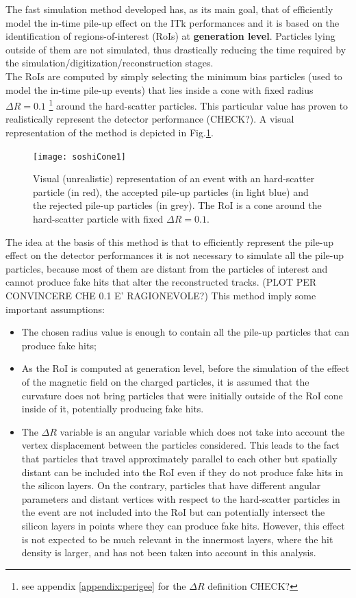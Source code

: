 \documentclass[a4paper,twoside,12pt]{article}
\begin{document}
The fast simulation method developed has, as its main goal, that of efficiently model the
in-time pile-up effect on the ITk performances and it is based on the identification of 
regions-of-interest (RoIs) at \textbf{generation level}. Particles lying outside of them are not 
simulated, thus drastically reducing the time required by the simulation/digitization/reconstruction stages. \\

The RoIs are computed by simply selecting the minimum bias particles (used to model the in-time
pile-up events) that lies inside a cone with fixed radius $\Delta R = 0.1$ \footnote{see appendix \ref{appendix:perigee} for the $\Delta R$ definition CHECK?}
around the hard-scatter particles. This particular value has proven to realistically represent the detector performance (CHECK?). A visual
representation of the method is depicted in Fig.\ref{fig:soshiCone1}.\\

\begin{figure} [h]
	\centering
	\texttt{[image: soshiCone1]}
	\caption{Visual (unrealistic) representation of an event with an hard-scatter particle (in red), 
	the accepted pile-up particles (in light blue) and the rejected pile-up particles (in grey).
	The RoI is a cone around the hard-scatter particle with fixed $\Delta R = 0.1$.}
	\label{fig:soshiCone1}
\end{figure}


The idea at the basis of this method is that to efficiently represent the pile-up effect on the
detector performances it is not necessary to simulate all the pile-up particles, because most 
of them are distant from the particles of interest and cannot produce fake hits that 
alter the reconstructed tracks. (PLOT PER CONVINCERE CHE 0.1 E' RAGIONEVOLE?) This 
method imply some important assumptions:
\begin{itemize}
\item The chosen radius value is enough to contain all the pile-up particles that can produce
fake hits;
\item As the RoI is computed at generation level, before the simulation of the effect of the
magnetic field on the charged particles, it is assumed that the curvature does not bring
particles that were initially outside of the RoI cone inside of it, potentially producing fake hits.
\item The $\Delta R$ variable is an angular variable which does not take into account the vertex displacement between the particles considered. This leads to the fact that particles 
that travel approximately parallel to each other but spatially distant can be included into the
RoI even if they do not produce fake hits in the silicon layers. On the contrary, particles that 
have different angular parameters and distant vertices with respect to the hard-scatter
particles in the event are not included into the RoI but can potentially intersect the silicon 
layers in points where they can produce fake hits. However, this effect is not expected
to be much relevant in the innermost layers, where the hit density is larger, and has not been
taken into account in this analysis. 
\end{itemize}
\end{document}
